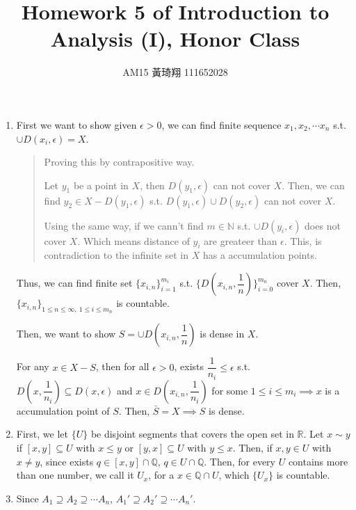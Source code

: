 \documentclass[12pt]{article}
\title{Homework 5 of Introduction to Analysis (I), Honor Class}
\author{AM15 黃琦翔 111652028}
\begin{document}
\maketitle
\begin{enumerate}
    \item First we want to show given $\epsilon > 0$, we can find finite sequence $x_1, x_2, \cdots x_n$ s.t. $\cup D(x_i, \epsilon) = X$.
    \begin{quote}
        Proving this by contrapositive way.

        Let $y_1$ be a point in $X$, then $D(y_1, \epsilon)$ can not cover $X$.
        Then, we can find $y_2\in X-D(y_1, \epsilon)$ s.t. $D(y_1, \epsilon) \cup D(y_2, \epsilon)$ can not cover $X$.

        Using the same way, if we cann't find $m \in \mathbb{N}$ s.t. $\cup D(y_i, \epsilon)$ does not cover $X$. Which means distance of $y_i$ are greateer than $\epsilon$.
        This, is contradiction to the infinite set in $X$ has a accumulation points.
    \end{quote} 

    Thus, we can find finite set $\lbrace x_{i, n}\rbrace_{i=1}^{m_i}$ s.t. $\lbrace D(x_{i, n}, \dfrac{1}{n})\rbrace_{i=0}^{m_n}$ cover $X$.
    Then, $\lbrace x_{i, n}\rbrace_{1\leq n\leq \infty,\ 1\leq i\leq m_n}$ is countable.

    Then, we want to show $S= \cup D(x_{i, n}, \dfrac{1}{n})$ is dense in $X$.

    For any $x\in X-S$, then for all $\epsilon > 0$, exists $\dfrac{1}{n_i} \leq \epsilon$ s.t. $D(x, \dfrac{1}{n_i})\subseteq D(x, \epsilon)$ and
    $x \in D(x_{i, n}, \dfrac{1}{n_i})$ for some $1\leq i \leq m_i\implies x$ is a accumulation point of $S$. Then, $\bar{S} = X\implies S$ is dense.


    \item First, we let $\lbrace U\rbrace$ be disjoint segments that covers the open set in $\mathbb{R}$.
    Let $x\sim y$ if $[x, y]\subseteq U$ with $x\leq y$ or $[y, x] \subseteq U$ with $y\leq x$.
    Then, if $x, y \in U$ with $x\neq y$, since exists $q \in [x, y]\cap \mathbb{Q}$, $q \in U\cap \mathbb{Q}$.
    Then, for every $U$ contains more than one number, we call it $U_x$, for a $x\in \mathbb{Q} \cap U$, which $\lbrace U_x \rbrace$ is countable.


    \newpage
    \item Since $A_1 \supseteq A_2\supseteq \cdots A_n$, $A_1' \supseteq A_2'\supseteq \cdots A_n'$.
    

\end{enumerate}
\end{document}
